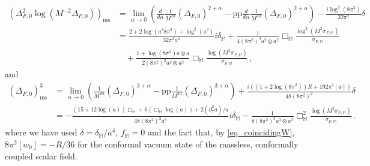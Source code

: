 \documentclass[a4paper,10pt,twoside]{article}
\numberwithin{equation}{section}
\newcounter{and}
\def\bbM{\mathbb{M}}
\def\pp{\mathrm{pp}}
\theoremstyle{plain}
\theoremstyle{definition}
\begin{document}
%
\begin{align*}
\left(\Delta^2_{F,0}\log \left(M^{-2} \Delta_{F,0}\right)\right)_\text{ms}&= \lim_{\alpha\to 0}\left(\frac{d}{d\alpha}\frac{1}{M^{2\alpha}}(\Delta_{F,0})^{2+\alpha}-\pp\frac{d}{d\alpha}\frac{1}{M^{2\alpha}}(\Delta_{F,0})^{2+\alpha}\right)-\frac{i\log^2(8\pi^2)}{32\pi^2}\delta\\
%
&=\frac{2+2\log (a^2 8\pi^2)+\log^2 (a^2)}{32\pi^2 a^4}i\delta_\bbM+\frac{1}{4(8\pi^2)^2 a^2\otimes a^2}\Box_{\bbM}\frac{\log^2\left(M^2\sigma_{F,\bbM}\right)}{\sigma_{F,\bbM}}\\
%
&\quad +\frac{1+\log(8\pi^2) a\otimes a}{2(8\pi^2)^2 a^2\otimes a^2}\Box_{\bbM}\frac{\log\left(M^2\sigma_{F,\bbM}\right)}{\sigma_{F,\bbM}} \,,
\end{align*}
%
and
%
\begin{align*}
(\Delta_{F,0})^3_\text{ms}&= \lim_{\alpha\to 0}\left(\frac{1}{M^{2\alpha}}(\Delta_{F,0})^{3+\alpha}-\pp\frac{1}{M^{2\alpha}}(\Delta_{F,0})^{3+\alpha}\right)+\frac{i\left((1+2\log(8\pi^2))R+192\pi^2[w]\right)}{48(8\pi^2)^2}\delta\\
%
&=-\frac{(15+12\log (a))\Box_\bbM+6(\Box_\bbM \log (a))+2(\partial^2_\tau a)/a}{48(8\pi^2)^2a^6}i\delta_\bbM-\frac{1}{8(8\pi^2)^3 a^3\otimes a^3}\Box^2_{\bbM}\frac{\log\left(M^2\sigma_{F,\bbM}\right)}{\sigma_{F,\bbM}}\,.
\end{align*}
%
where we have used $\delta=\delta_{\bbM}/a^4$, $f_{\bbM}=0$ and the fact that, by \eqref{eq_coincidingW}, $8\pi^2[w_0]=-R/36$ for the conformal vacuum state of the massless, conformally coupled scalar field. 
\end{document}
